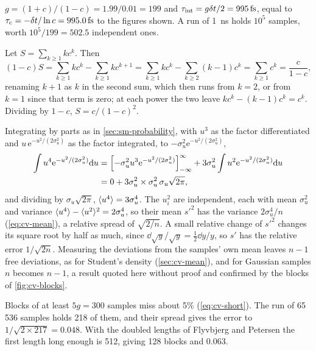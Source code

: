 $g = (1 + c)/(1 - c) = 1.99/0.01 = 199$ and
$\tau_{\mathrm{int}} = g\dt/2 = \SI{995}{\femto\second}$, equal to
$\tau_{\mathrm c} = -\dt/\ln c = \SI{995.0}{\femto\second}$ to the figures
shown. A run of \SI{1}{\nano\second} holds $10^5$ samples, worth $10^5/199
= 502.5$ independent ones.

Let $S = \sum_{k\ge1}kc^k$. Then
\begin{equation*}
   (1 - c)S = \sum_{k\ge1}kc^k - \sum_{k\ge1}kc^{k+1}
   = \sum_{k\ge1}kc^k - \sum_{k\ge2}(k - 1)c^k
   = \sum_{k\ge1}c^k = \frac{c}{1 - c} ,
\end{equation*}
renaming $k + 1$ as $k$ in the second sum, which then runs from $k = 2$,
or from $k = 1$ since that term is zero; at each power the two leave $kc^k
- (k - 1)c^k = c^k$. Dividing by $1 - c$, $S = c/(1 - c)^2$.

Integrating by parts as in
\cref{sec:sm-probability}, with $u^3$ as the factor differentiated and
$u\,\mathrm{e}^{-u^2/(2\sigma_u^2)}$ as the factor integrated, to
$-\sigma_u^2\mathrm{e}^{-u^2/(2\sigma_u^2)}$,
\begin{align*}
   \int u^4\mathrm{e}^{-u^2/(2\sigma_u^2)}\mathrm{d} u
   &= \Bigl[-\sigma_u^2u^3\mathrm{e}^{-u^2/(2\sigma_u^2)}\Bigr]_{-\infty}^\infty
   + 3\sigma_u^2\int u^2\mathrm{e}^{-u^2/(2\sigma_u^2)}\mathrm{d} u\\
   &= 0 + 3\sigma_u^2\times\sigma_u^2\,\sigma_u\sqrt{2\pi} ,
\end{align*}
and dividing by $\sigma_u\sqrt{2\pi}$, $\langle u^4 \rangle = 3\sigma_u^4$. The $u_i^2$
are independent, each with mean $\sigma_u^2$ and variance $\langle u^4 \rangle -
\langle u^2 \rangle^2 = 2\sigma_u^4$, so their mean $s'^2$ has the variance
$2\sigma_u^4/n$ (\cref{eq:cv-mean}), a relative spread of $\sqrt{2/n}$. A
small relative change of $s'^2$ changes its square root by half as much,
since $\dd\sqrt y/\sqrt y = \frac12\dd y/y$, so $s'$ has the relative error
$1/\sqrt{2n}$. Measuring the deviations from the samples' own mean leaves
$n - 1$ free deviations, as for Student's density (\cref{sec:cv-mean}),
and for Gaussian samples $n$ becomes $n - 1$, a result quoted here without
proof and confirmed by the blocks of \cref{fig:cv-blocks}.

Blocks of at least $5g = 300$ samples miss
about 5\% (\cref{eq:cv-short}). The run of 65\,536 samples holds 218 of
them, and their spread gives the error to $1/\sqrt{2\times217} = 0.048$. With
the doubled lengths of Flyvbjerg and Petersen the first length long enough
is 512, giving 128 blocks and 0.063.

